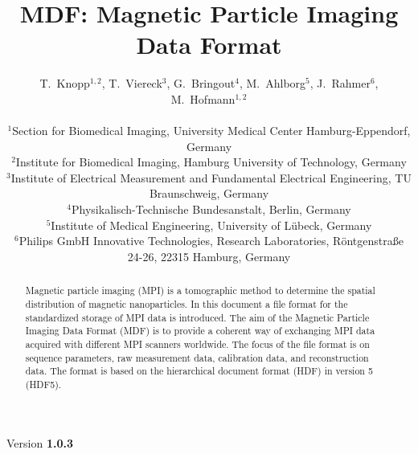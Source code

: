 \documentclass[landscape]{article} %
\begin{document}
\title{MDF: Magnetic Particle Imaging Data Format}
\newcommand{\version}{1.0.3}

\author{
T.~Knopp$^{1,2}$, T.~Viereck$^{3}$, G.~Bringout$^{4}$, M.~Ahlborg$^{5}$, J.~Rahmer$^6$, M.~Hofmann$^{1,2}$ \\ \\
$^1$Section for Biomedical Imaging, University Medical Center Hamburg-Eppendorf, Germany\\
$^2$Institute for Biomedical Imaging, Hamburg University of Technology, Germany\\
$^3$Institute of Electrical Measurement and Fundamental Electrical Engineering, TU Braunschweig, Germany\\
$^4$Physikalisch-Technische Bundesanstalt, Berlin, Germany\\
$^5$Institute of Medical Engineering, University of  Lübeck, Germany\\
$^6$Philips GmbH Innovative Technologies, Research Laboratories, Röntgenstraße 24-26, 22315 Hamburg, Germany
}


\maketitle
\begin{center}
Version \textbf{\version}
\end{center}

\begin{abstract}
Magnetic particle imaging (MPI) is a tomographic method to determine the spatial distribution of magnetic nanoparticles. In this document a file format for the standardized storage of MPI data is introduced. The aim of the Magnetic Particle Imaging Data Format (MDF) is to provide a coherent way of exchanging MPI data acquired with different MPI scanners worldwide. The focus of the file format is on sequence parameters, raw measurement data, calibration data, and reconstruction data. The format is based on the hierarchical document format (HDF) in version 5 (HDF5).
\end{abstract}
\end{document}
